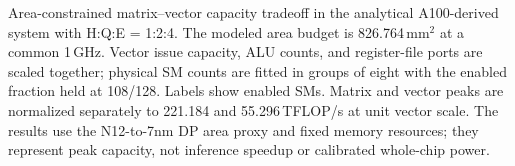\caption{Area-constrained matrix--vector capacity tradeoff in the analytical
A100-derived system with H:Q:E = 1:2:4. The modeled area budget is
826.764\,mm$^2$ at a common 1\,GHz. Vector issue capacity, ALU counts, and
register-file ports are scaled together; physical SM counts are fitted in
groups of eight with the enabled fraction held at 108/128. Labels show enabled
SMs. Matrix and vector peaks are normalized separately to 221.184 and
55.296\,TFLOP/s at unit vector scale. The results use the N12-to-7nm DP area
proxy and fixed memory resources; they represent peak capacity, not inference
speedup or calibrated whole-chip power.}
\label{fig:llmcompass-system-resource-tradeoff}
